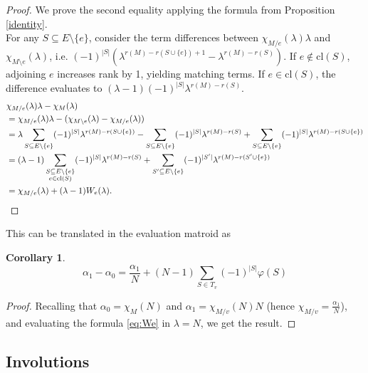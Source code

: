 \documentclass[11pt,a4paper]{article}
\newtheorem{corollary}[theorem]{Corollary}
\theoremstyle{definition}
\begin{document}
\begin{proof}
We prove the second equality applying the formula from Proposition \ref{identity}. \\
For any $S \subseteq E \setminus \{e\}$, consider the term differences between $ \chi_{M/e}(\lambda)\lambda$ and $\chi_{M \setminus e}(\lambda)$, i.e. $(-1)^{|S|}(\lambda^{r(M)-r(S \cup \{e\}) + 1} - \lambda^{r(M)-r(S)}) $. If $e \notin \mathrm{cl}(S)$, adjoining $e$ increases rank by 1, yielding matching terms. If $e \in \mathrm{cl}(S)$, the difference evaluates to $(\lambda - 1)(-1)^{|S|} \lambda^{r(M) - r(S)}$.
\begin{align*}
&\chi_{M/e}(\lambda)\lambda - \chi_M(\lambda) \\ &=  \chi_{M/e}(\lambda)\lambda - (\chi_{M\setminus e}(\lambda) - \chi_{M / e}(\lambda)) \\&= \lambda \sum_{S \subseteq E \setminus \{e\}} (-1)^{|S|} \lambda^{r(M) - r(S \cup \{e\})} - \sum_{S \subseteq E \setminus \{e\}} (-1)^{|S|} \lambda^{r(M) - r(S)} + \sum_{S \subseteq E \setminus \{e\}} (-1)^{|S|} \lambda^{r(M) - r(S \cup \{e\})} \\
&= (\lambda - 1) \sum_{\substack{S \subseteq E \setminus \{e\} \\ e \in \mathrm{cl}(S)}} (-1)^{|S|} \lambda^{r(M) - r(S)} + \sum_{S' \subseteq E \setminus \{e\}} (-1)^{|S'|} \lambda^{r(M) - r(S' \cup \{e\})} \\
&= \chi_{M/e}(\lambda) + (\lambda - 1) W_e(\lambda).  \qedhere 
\end{align*}
\end{proof}

This can be translated in the evaluation matroid as

\begin{corollary} \label{cor:We-alpha}
    \begin{equation*}
        \alpha_1 - \alpha_0 = \frac{\alpha_1}{N} + (N - 1)\sum_{S \in T_v}(-1)^{|S|}\varphi(S)
    \end{equation*}
\end{corollary}

\begin{proof}
    Recalling that $\alpha_0 = \chi_{M}(N)$ and $\alpha_1 = \chi_{M/v}(N)N$ (hence $\chi_{M/v} = \frac{\alpha_1}{N}$), and evaluating the formula \eqref{eq:We} in $\lambda = N$, we get the result.
\end{proof}

\subsection{Involutions}\label{subsec:involutions}
\end{document}
